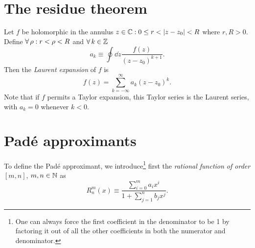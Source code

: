 \section{The residue theorem}

Let $f$ be holomorphic in the annulus ${z\in\C : 0\leq r<|z-z_0|<R}$
where $r,R>0$.
Define $\operatorname{\forall}\rho : r<\rho<R$ and $\operatorname{\forall} k\in\mathbb{Z}$
\begin{equation}
  a_k\equiv\oint\dd{z}\frac{f(z)}{(z-z_0)^{k+1}}.
\end{equation}
Then the {\it Laurent expansion} of $f$ is
\begin{equation}
  f(z)=\sum_{k=-\infty}^\infty a_k(z-z_0)^k.
\end{equation}
Note that if $f$ permits a Taylor expansion, this Taylor series is the Laurent
series, with $a_k=0$ whenever $k<0$.



\section{Pad\'e approximants}

To define the Pad\'e approximant, we introduce\footnote{One can always force
the first coefficient in the denominator to be 1 by factoring it out of all
the other coefficients in both the numerator and denominator.} first the {\it rational
function of order} $[m,n]$, $m,n\in\mathbb{N}$ as 
\begin{equation}
  R_n^m(x)\equiv\frac{\sum_{i=0}^m a_ix^i}{1+\sum_{j=1}^nb_jx^j}.
\end{equation}




